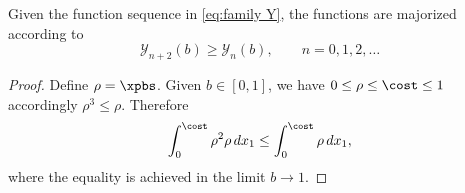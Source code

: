 \begin{myTheorem}  
Given the function sequence in \eqref{eq:family Y}, the functions are majorized according to
  \begin{equation}
    \mathcal{Y}_{n+2}(b) \ge \mathcal{Y}_{n}(b), \qquad n = 0, 1, 2, \dots
  \end{equation}
  \label{th:response}
\end{myTheorem}  %
\begin{proof}  %
Define $\rho = \xpbs$. Given $b\in[0,1]$, we have $0 \le \rho \le \cost \le 1$ accordingly $\rho^{3} \le \rho$. Therefore
  \begin{equation}
    \int_{0}^{\cost} \rho^{2} \rho \, dx_{1} \le \int_{0}^{\cost} \rho \, dx_{1} ,
  \end{equation}
where the equality is achieved in the limit $b\to 1$.
\end{proof}  %

\endinput %